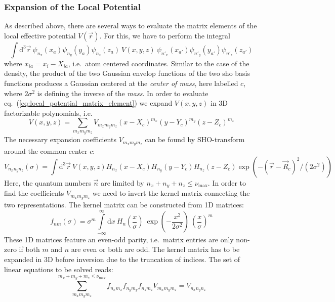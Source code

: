 \documentclass[oribibl]{llncs}
\newcommand{\um}[1]{_{\mathrm{#1}}}
\newcommand{\numax}{\nu\um{max}}
\begin{document}
\subsubsection{Expansion of the Local Potential}
As described above, there are several ways to evaluate the matrix elements of the local effective potential $V(\vec r)$.
For this, we have to perform the integral
\begin{equation}
	\int \mathrm d^3 \vec r  \  \psi_{n_x}(x_a)\psi_{n_y}(y_a)\psi_{n_z}(z_a)  \  V(x,y,z) \ 
	                            \psi_{n'_x}(x_{a'})\psi_{n'_y}(y_{a'})\psi_{n'_z}(z_{a'})
	                            \label{eq:local_potential_matrix_element}
\end{equation}
where $x_{ia} = x_{i} - X_{ia}$, i.e.~atom centered coordinates.
Similar to the case of the density, the product of the two Gaussian envelop functions of the 
two \ac{sho} basis functions produces a Gaussian centered at the \emph{center of mass}, here labelled $c$, where
$2\sigma^2$ is defining the inverse of the \emph{mass}.
In order to evaluate eq.~(\ref{eq:local_potential_matrix_element}) we
expand $V(x,y,z)$ in 3D factorizable polynomials, i.e.
\begin{equation}
	V(x,y,z) = \sum_{m_x m_y m_z} V_{m_x m_y m_z} (x - X_c)^{m_x} (y - Y_c)^{m_y} (z - Z_c)^{m_z}
	                            \label{eq:local_potential_polynomial_expansion}
\end{equation}
The necessary expansion coefficients $V_{m_x m_y m_z}$ can be found by SHO-transform around the common center $c$:
\begin{equation}
	V_{n_x n_y n_z}(\sigma) = \int \mathrm d^3 \vec r  \   V(x,y,z) H_{n_x}(x - X_c) H_{n_y}(y - Y_c) H_{n_z}(z - Z_c) 
		\exp(-(\vec r - \vec R_c)^2/(2 \sigma^2))
	                            \label{eq:local_potential_projection}
\end{equation}
Here, the quantum numbers $\vec n$ are limited by $n_x + n_y + n_z \leq \numax$.
In order to find the coefficients $V_{m_x m_y m_z}$ we need to invert the kernel matrix connecting the two
representations. The kernel matrix can be constructed from 1D matrices:
$$ f_{nm}(\sigma) = \sigma^m \int\limits_{-\infty}^{\infty} \mathrm dx \  H_{n}\left( \frac{x}{\sigma} \right) \  \exp\left( -\frac{x^2}{2\sigma^2} \right) \  \left(\frac{x}{\sigma}\right)^m $$
These 1D matrices feature an even-odd parity, 
i.e.~matrix entries are only non-zero if both $m$ and $n$ are even or both are odd.
The kernel matrix has to be expanded in 3D before inversion due to the truncation
of indices. The set of linear equations to be solved reads:
$$ \sum_{m_x m_y m_z}^{m_x + m_y + m_z \leq \numax} f_{n_x m_x} f_{n_y m_y} f_{n_z m_z} V_{m_x m_y m_z} = V_{n_x n_y n_z} $$
\end{document}
